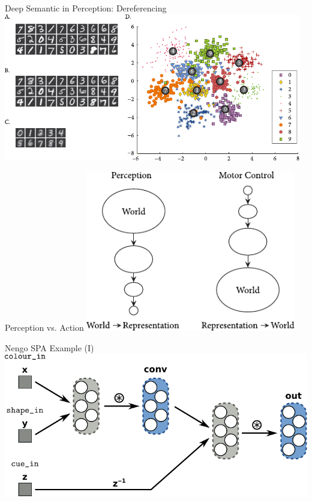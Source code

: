 \documentclass[handout,aspectratio=169]{beamer}
\begin{document}
	\begin{frame}{Deep Semantic in Perception: Dereferencing}
		\centering
		\vspace{0.5cm}
		\includegraphics[width=0.975\textwidth]{media/htbab_dereference.pdf}\\
		\vspace{0.0575cm}
	\end{frame}

	\begin{frame}{Perception vs. Action}
		\centering
		\includegraphics[height=7cm]{media/htbab_perceptual_motor.pdf}
	\end{frame}

	\begin{frame}{Nengo SPA Example (I)}
		\centering
		\includegraphics[width=\textwidth]{media/spa_network.pdf}
	\end{frame}
\end{document}
